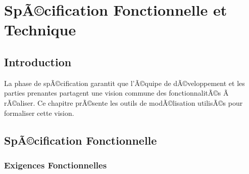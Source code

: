 ﻿%
\chapter{SpÃ©cification Fonctionnelle et Technique}


\section{Introduction}

La phase de spÃ©cification garantit que l'Ã©quipe de dÃ©veloppement et les parties
prenantes partagent une vision commune des fonctionnalitÃ©s Ã  rÃ©aliser. Ce chapitre
prÃ©sente les outils de modÃ©lisation utilisÃ©s pour formaliser cette vision.

\section{SpÃ©cification Fonctionnelle}

\subsection{Exigences Fonctionnelles}


